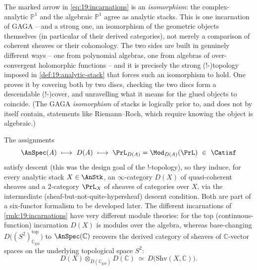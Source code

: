 \begin{remark}
\label{rmk:19:gaga}
The marked arrow in \eqref{eq:19:incarnations} is an \emph{isomorphism}: the
complex-analytic $\mathbb P^1$ and the algebraic $\mathbb P^1$ agree as analytic
stacks. This is one incarnation of GAGA -- and a strong one, an isomorphism of
the geometric objects themselves (in particular of their derived categories), not
merely a comparison of coherent sheaves or their cohomology. The two sides are
built in genuinely different ways -- one from polynomial algebras, one from
algebras of over-convergent holomorphic functions -- and it is precisely the
strong ($!$-)topology imposed in \cref{def:19:analytic-stack} that forces such an
isomorphism to hold. One proves it by covering both by two discs, checking the
two discs form a descendable ($!$-)cover, and unravelling what it means for the
glued objects to coincide. (The GAGA \emph{isomorphism} of stacks is logically
prior to, and does not by itself contain, statements like Riemann--Roch, which
require knowing the object is algebraic.)
\end{remark}

\begin{remark}
\label{rmk:19:D-sheaf}
The assignments
\begin{equation*}
\AnSpec(A)\ \longmapsto\ D(A)\ \longmapsto\ \PrL_{D(A)}=\Mod_{D(A)}(\PrL)\ \in\ \Catinf
\end{equation*}
satisfy descent (this was the design goal of the $!$-topology), so they induce,
for every analytic stack $X\in\AnStk$, an $\infty$-category $D(X)$ of
quasi-coherent sheaves and a $2$-category $\PrL_X$ of sheaves of categories over
$X$, via the intermediate (sheaf-but-not-quite-hypersheaf) descent condition.
Both are part of a six-functor formalism to be developed later. The different
incarnations of \cref{rmk:19:incarnations} have very different module theories:
for the top (continuous-function) incarnation $D(X)$ is modules over the algebra,
whereas base-changing $D\bigl((S^2)^{\mathrm{top}}_{\mathbb C_{\mathrm{gas}}}\bigr)$
to $\AnSpec(\mathbb C)$ recovers the derived category of sheaves of $\mathbb
C$-vector spaces on the underlying topological space $S^2$:
\begin{equation*}
D(X)\otimes_{D(\mathbb C_{\mathrm{gas}})}D(\mathbb C)\ \simeq\ D\bigl(\mathrm{Shv}(X,\mathbb C)\bigr).
\end{equation*}
\end{remark}


